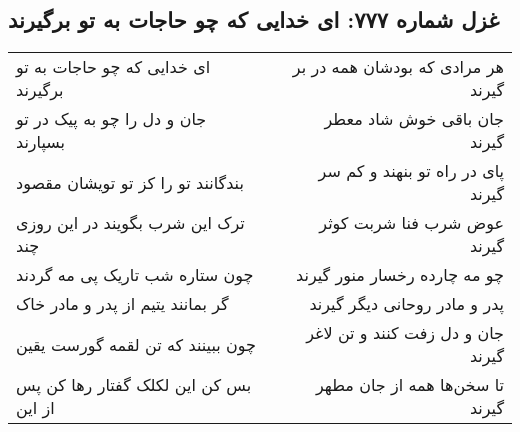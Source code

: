 \begin{center}
\section*{غزل شماره ۷۷۷: ای خدایی که چو حاجات به تو برگیرند}
\label{sec:0777}
\begin{longtable}{l p{0.5cm} r}
ای خدایی که چو حاجات به تو برگیرند
&&
هر مرادی که بودشان همه در بر گیرند
\\
جان و دل را چو به پیک در تو بسپارند
&&
جان باقی خوش شاد معطر گیرند
\\
بندگانند تو را کز تو تویشان مقصود
&&
پای در راه تو بنهند و کم سر گیرند
\\
ترک این شرب بگویند در این روزی چند
&&
عوض شرب فنا شربت کوثر گیرند
\\
چون ستاره شب تاریک پی مه گردند
&&
چو مه چارده رخسار منور گیرند
\\
گر بمانند یتیم از پدر و مادر خاک
&&
پدر و مادر روحانی دیگر گیرند
\\
چون ببینند که تن لقمه گورست یقین
&&
جان و دل زفت کنند و تن لاغر گیرند
\\
بس کن این لکلک گفتار رها کن پس از این
&&
تا سخن‌ها همه از جان مطهر گیرند
\\
\end{longtable}
\end{center}
